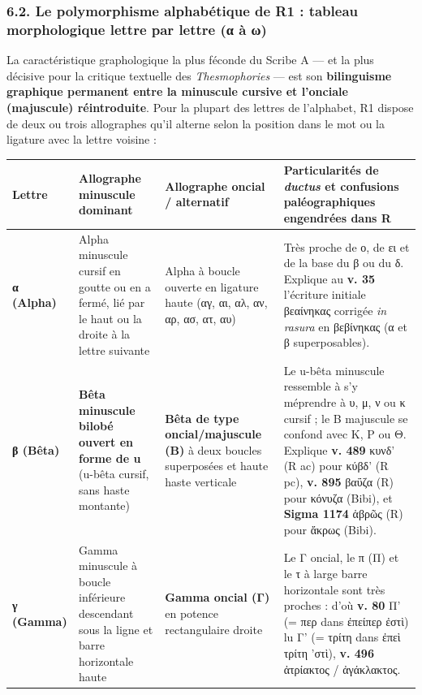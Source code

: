 \documentclass[11pt, a4paper, twoside]{article}
\renewcommand{\_}{\origunderscore\penalty0\relax}
\renewcommand{\texttt}[1]{#1}
\newcommand{\R}{\textbf{R}}
\newcommand{\Run}{\textbf{R}\textsuperscript{1}}
\newcommand{\Rac}{\textbf{R}\textsuperscript{ac}}
\newcommand{\Rpc}{\textbf{R}\textsuperscript{pc}}
\newcommand{\Bibi}{\textit{Bibi}}
\newcommand{\SigmaSchol}{\textgreek{Σ}}
\def\R{R}%
\def\Run{R1}%
\def\Rac{R ac}%
\def\Rpc{R pc}%
\def\Bibi{Bibi}%
\def\SigmaSchol{Sigma}%
\begin{document}
\subsubsection{6.2. Le polymorphisme alphabétique de \Run{} : tableau morphologique lettre par lettre (α à ω)}

La caractéristique graphologique la plus féconde du Scribe A — et la plus décisive pour la critique textuelle des \textit{Thesmophories} — est son \textbf{bilinguisme graphique permanent entre la minuscule cursive et l'onciale (majuscule) réintroduite}. Pour la plupart des lettres de l'alphabet, \Run{} dispose de deux ou trois allographes qu'il alterne selon la position dans le mot ou la ligature avec la lettre voisine :

{\small
\begin{longtable}{@{}>{\raggedright\arraybackslash}p{} >{\raggedright\arraybackslash}p{} >{\raggedright\arraybackslash}p{} >{\raggedright\arraybackslash}p{}@{}}
\toprule
\textbf{Lettre} & \textbf{Allographe minuscule dominant} & \textbf{Allographe oncial / alternatif} & \textbf{Particularités de \textit{ductus} et confusions paléographiques engendrées dans \R{}} \\
\midrule
\endhead
\bottomrule
\endfoot
\textbf{α (Alpha)} & Alpha minuscule cursif en goutte ou en \texttt{a} fermé, lié par le haut ou la droite à la lettre suivante & Alpha à boucle ouverte en ligature haute (αγ, αι, αλ, αν, αρ, ασ, ατ, αυ) & Très proche de ο, de ει et de la base du β ou du δ. Explique au \textbf{v. 35} l'écriture initiale \texttt{βεαίνηκας} corrigée \textit{in rasura} en \texttt{βεβίνηκας} (\texttt{α} et \texttt{β} superposables). \\
\addlinespace[3pt]
\textbf{β (Bêta)} & \textbf{Bêta minuscule bilobé ouvert en forme de \texttt{u}} (\texttt{u}-bêta cursif, sans haste montante) & \textbf{Bêta de type oncial/majuscule (\texttt{Β})} à deux boucles superposées et haute haste verticale & Le \texttt{u}-bêta minuscule ressemble à s'y méprendre à υ, μ, ν ou κ cursif ; le \texttt{Β} majuscule se confond avec Κ, Ρ ou Θ. Explique \textbf{v. 489} \texttt{κυνδ'} (\Rac{}) pour \texttt{κύβδ'} (\Rpc{}), \textbf{v. 895} \texttt{βαΰζα} (\R{}) pour \texttt{κόνυζα} (\Bibi{}), et \textbf{\SigmaSchol{} 1174} \texttt{ἁβρῶς} (\R{}) pour \texttt{ἄκρως} (\Bibi{}). \\
\addlinespace[3pt]
\textbf{γ (Gamma)} & Gamma minuscule à boucle inférieure descendant sous la ligne et barre horizontale haute & \textbf{Gamma oncial (\texttt{Γ})} en potence rectangulaire droite & Le \texttt{Γ} oncial, le π (\texttt{Π}) et le τ à large barre horizontale sont très proches : d'où \textbf{v. 80} \texttt{Π'} (\texttt{= περ} dans \texttt{ἐπείπερ ἐστὶ}) lu \texttt{Γ'} (\texttt{= τρίτη} dans \texttt{ἐπεὶ τρίτη 'στὶ}), \textbf{v. 496} \texttt{ἀτρίακτος} / \texttt{ἀγάκλακτος}. \\

\end{longtable}}
\end{document}
